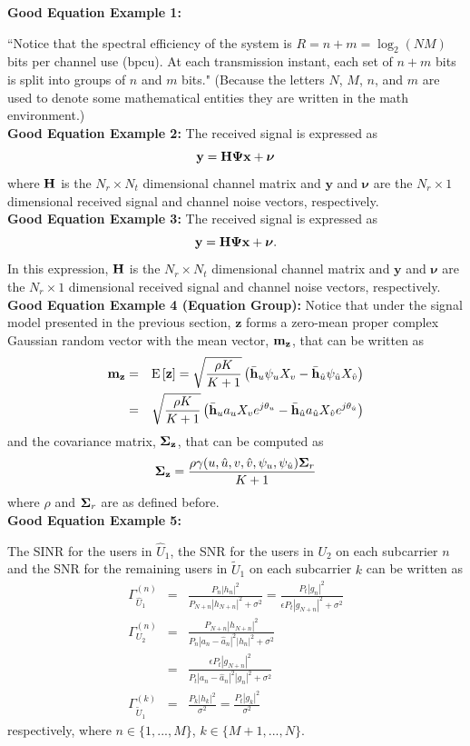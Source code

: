 \documentclass[a4paper,oneside,12pt]{report}
\newcommand{\beq}{\begin{equation} \setlength\abovedisplayskip{5pt} 
\setlength\belowdisplayskip{5pt}}
\newcommand{\eeq}{\end{equation}}
\newcommand{\bea}{\begin{eqnarray}}
\newcommand{\eea}{\end{eqnarray}}
\newcommand{\nnl}{\nonumber \\}
\numberwithin{equation}{chapter}
\begin{document}
{\textbf{Good Equation Example 1:}}

``Notice that the spectral efficiency of the system is $R=n+m=\log_2(NM)$ bits per channel use (bpcu).  At each transmission instant,  each set of $n+m$ bits is split into groups of $n$ and $m$ bits." (Because the letters $N$, $M$, $n$, and $m$ are used to denote some mathematical entities they are written in the math environment.)\\

{\textbf{Good Equation Example 2:}}
The received signal is expressed as
\beq
{\mathbf y}={\mathbf H}{\bf \Psi}{\mathbf x} + {\bm{\nu}} 
\eeq where ${\bf H}$ is the $N_r \times N_t$ dimensional channel matrix and ${\mathbf y}$ and ${\bm{\nu}} $ are the $N_r \times 1$ dimensional received signal and channel noise vectors, respectively. \\

{\textbf{Good Equation Example 3:}}
The received signal is expressed as
\beq
{\mathbf y}={\mathbf H}{\bf \Psi}{\mathbf x} + {\bm{\nu}}. 
\eeq In this expression, ${\bf H}$ is the $N_r \times N_t$ dimensional channel matrix and ${\mathbf y}$ and ${\bm{\nu}} $ are the $N_r \times 1$ dimensional received signal and channel noise vectors, respectively. \\

{\textbf{Good Equation Example 4 (Equation Group):}}
Notice that under the signal model presented in the previous section, ${\mathbf z}$ forms a zero-mean proper complex Gaussian random vector with the mean vector, ${\bf m}_{\bf z}$, that can be written as
\bea{\bf m}_{\bf z} &=& \mbox{E} \left[{\bf z}\right]= \sqrt{\frac{\rho K}{K+1}}\left( \bar{\bf h}_u \psi_u X_v -\bar{\bf h}_{\hat{u}} \psi_{\hat{u}} X_{\hat{v}}\right)\nnl
&=&\sqrt{\frac{\rho K}{K+1}}\left( \bar{\bf h}_u a_u X_v e^{j\theta_u}-\bar{\bf h}_{\hat{u}} a_{\hat{u}} X_{\hat{v}}e^{j\theta_{\hat{u}}}\right)\eea and the covariance matrix,  ${\bf \Sigma}_{\bf z}$, that can be computed as
\beq
{\bf \Sigma}_{\bf z} =\frac{\rho  \gamma(u, \hat{u}, v, \hat{v}, \psi_u, \psi_{\hat{u}}) {\bf \Sigma}_r}{K+1} 
\eeq 
where $\rho$  and ${\bf \Sigma}_r$ are  as defined before.\\

{ \textbf{Good Equation Example 5:} }

The SINR for the users in $\hat{U}_1$, the SNR for the users in $U_2$ on each subcarrier $n$ and the SNR for the remaining users in $\tilde{U}_1$ on each subcarrier $k$ can be written as
\bea
\Gamma^{(n)}_{\hat{U}_1} &=& \frac{P_n |h_n|^2}{P_{N+n} |h_{N+n}|^2 + \sigma^2} = \frac{P_t |g_n|^2}{\epsilon P_t |g_{N+n}|^2 + \sigma^2} \\
\Gamma^{(n)}_{U_2} &=& \frac{P_{N+n} |h_{N+n}|^2}{P_n |a_n - \hat{a}_n|^2 |h_n|^2 + \sigma^2} \nonumber \\
&=& \frac{\epsilon P_t |g_{N+n}|^2}{P_t |a_n - \hat{a}_n|^2 |g_{n}|^2 + \sigma^2}\\
\Gamma^{(k)}_{\tilde{U}_1} &=& \frac{P_{k} |h_{k}|^2}{\sigma^2} = \frac{P_t |g_{k}|^2}{\sigma^2}
\eea
respectively, where $n \in \{1, ..., M\}$, $k \in \{M+1, ..., N\}$. \\
\end{document}
